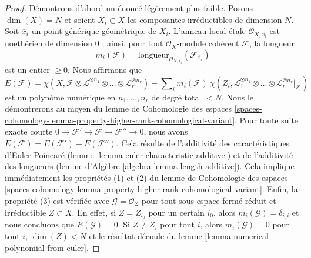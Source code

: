 \begin{proof}
Démontrons d'abord un énoncé légèrement plus faible. Posons
$\dim(X) = N$ et soient $X_i \subset X$ les composantes
irréductibles de dimension $N$. Soit $\overline{x}_i$ un point
générique géométrique de $X_i$. L'anneau local \'etale
$\mathcal{O}_{X, \overline{x}_i}$ est noethérien de
dimension $0$ ; ainsi, pour tout $\mathcal{O}_X$-module cohérent
$\mathcal{F}$, la longueur
$$
m_i(\mathcal{F}) = \text{longueur}_{\mathcal{O}_{X, \overline{x}_i}}
(\mathcal{F}_{\overline{x}_i})
$$
est un entier $\geq 0$. Nous affirmons que
$$
E(\mathcal{F}) =
\chi(X, \mathcal{F} \otimes \mathcal{L}_1^{\otimes n_1} \otimes \ldots \otimes
\mathcal{L}_r^{\otimes n_r}) -
\sum\nolimits_i
m_i(\mathcal{F})\ \chi(Z_i, \mathcal{L}_1^{\otimes n_1} \otimes \ldots \otimes
\mathcal{L}_r^{\otimes n_r}|_{Z_i})
$$
est un polynôme numérique en $n_1, \ldots, n_r$ de degré total $< N$.
Nous le démontrerons au moyen du lemme de Cohomologie des espaces
\ref{spaces-cohomology-lemma-property-higher-rank-cohomological-variant}.
Pour toute suite exacte courte $0 \to \mathcal{F}' \to \mathcal{F} \to
\mathcal{F}'' \to 0$, nous avons
$E(\mathcal{F}) = E(\mathcal{F}') + E(\mathcal{F}'')$.
Cela résulte de l'additivité des caractéristiques d'Euler-Poincaré
(lemme \ref{lemma-euler-characteristic-additive})
et de l'additivité des longueurs
(lemme d'Algèbre \ref{algebra-lemma-length-additive}).
Cela implique immédiatement les propriétés (1) et (2) du lemme de Cohomologie des espaces
\ref{spaces-cohomology-lemma-property-higher-rank-cohomological-variant}.
Enfin, la propriété (3) est vérifiée avec $\mathcal{G} = \mathcal{O}_Z$
pour tout sous-espace fermé réduit et irréductible $Z \subset X$.
En effet, si $Z = Z_{i_0}$ pour un certain $i_0$, alors
$m_i(\mathcal{G}) = \delta_{i_0i}$ et nous concluons que $E(\mathcal{G}) = 0$.
Si $Z \not = Z_i$ pour tout $i$, alors $m_i(\mathcal{G}) = 0$ pour tout $i$,
$\dim(Z) < N$ et le résultat découle du
lemme \ref{lemma-numerical-polynomial-from-euler}.


\end{proof}
